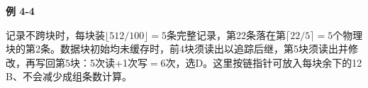 {\color{ink}\bfseries 例 4-4}\par\vspace{1bp}记录不跨块时，每块装\(\lfloor 512/\allowbreak{}100\rfloor =\allowbreak{}5\)条完整记录，第22条落在第\(\lceil 22/\allowbreak{}5\rceil =\allowbreak{}5\)个物理块的第2条。数据块初始均未缓存时，前4块须读出以追踪后继，第5块须读出并修改，再写回第5块：5次读+\allowbreak{}1次写\(=\allowbreak{}6\)次，选D。这里按链指针可放入每块余下的12 B、不会减少成组条数计算。
